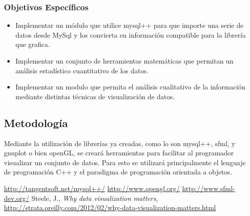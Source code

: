 \documentclass[11pt]{article}
\begin{document}
\subsubsection*{Objetivos Específicos}
\begin{itemize}
\item Implementar un módulo que utilice mysql++ para que importe una serie de datos desde MySql 
      y los convierta en información compatible para la librería que grafica.
\item Implementar un conjunto de herramientas matemáticas que permitan un análisis estadístico cuantitativo de los datos.
\item Implementar un modulo que permita el análisis cualitativo de la información mediante distintas técnicas de visualización de datos.
\end{itemize}

\subsection*{Metodología}
Mediante la utilización de librerías ya creadas, como lo son mysql++, sfml, y gnuplot o bien openGL, 
se creará herramientas para facilitar al programador visualizar un conjunto de datos. Para esto se utilizará principalmente el
lenguaje de programación C++ y el paradigma de programación orientada a objetos.

\begin{thebibliography}{10}
\url{http://tangentsoft.net/mysql++/}
\url{http://www.opengl.org/}
\url{http://www.sfml-dev.org/}
Steele, J., \textit{Why data visualization matters}, \url{http://strata.oreilly.com/2012/02/why-data-visualization-matters.html}
\end{thebibliography}
\end{document}
